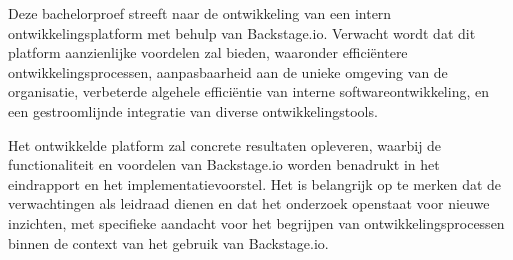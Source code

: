 Deze bachelorproef streeft naar de ontwikkeling van een intern ontwikkelingsplatform met behulp van Backstage.io. Verwacht wordt dat dit platform aanzienlijke voordelen zal bieden, waaronder efficiëntere ontwikkelingsprocessen, aanpasbaarheid aan de unieke omgeving van de organisatie, verbeterde algehele efficiëntie van interne softwareontwikkeling, en een gestroomlijnde integratie van diverse ontwikkelingstools.

Het ontwikkelde platform zal concrete resultaten opleveren, waarbij de functionaliteit en voordelen van Backstage.io worden benadrukt in het eindrapport en het implementatievoorstel. Het is belangrijk op te merken dat de verwachtingen als leidraad dienen en dat het onderzoek openstaat voor nieuwe inzichten, met specifieke aandacht voor het begrijpen van ontwikkelingsprocessen binnen de context van het gebruik van Backstage.io.

